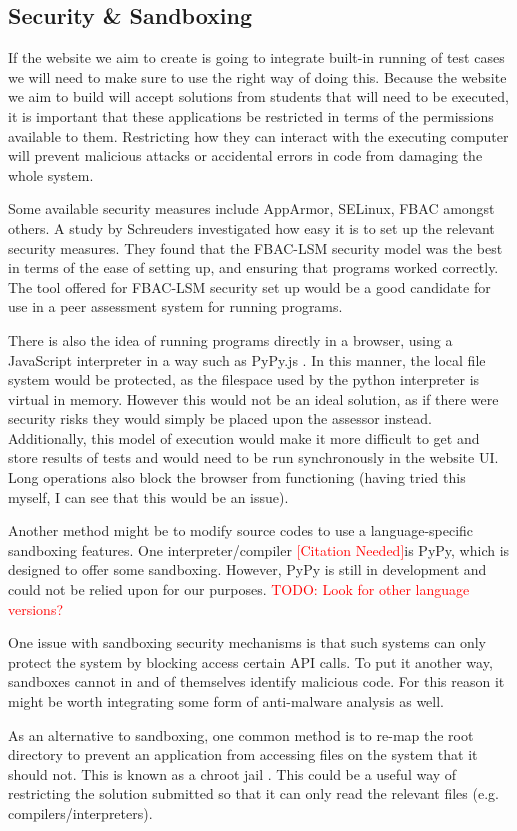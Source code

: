 \documentclass[a4paper,11pt]{report}
\newcommand{\cn}{\textcolor{red}{[Citation Needed]}}
\newcommand{\todo}[1]{\textcolor{red}{TODO: #1}}
\begin{document}
\subsection{Security \& Sandboxing}
If the website we aim to create is going to integrate built-in running of test cases we will need to make sure to use the right way of doing this. Because the website we aim to build will accept solutions from students that will need to be executed, it is important that these applications be restricted in terms of the permissions available to them. Restricting how they can interact with the executing computer will prevent malicious attacks or accidental errors in code from damaging the whole system.\par
Some available security measures include AppArmor, SELinux, FBAC amongst others. A study by Schreuders \cite{schreuders_empowering_2011} investigated how easy it is to set up the relevant security measures. They found that the FBAC-LSM security model was the best in terms of the ease of setting up, and ensuring that programs worked correctly. The tool offered for FBAC-LSM security set up would be a good candidate for use in a peer assessment system for running programs.\par
There is also the idea of running programs directly in a browser, using a JavaScript interpreter in a way such as PyPy.js \cite{pypy_web_2016}. In this manner, the local file system would be protected, as the filespace used by the python interpreter is virtual in memory. However this would not be an ideal solution, as if there were security risks they would simply be placed upon the assessor instead. Additionally, this model of execution would make it more difficult to get and store results of tests and would need to be run synchronously in the website UI. Long operations also block the browser from functioning (having tried this myself, I can see that this would be an issue).\par
Another method might be to modify source codes to use a language-specific sandboxing features. One interpreter/compiler \cn is PyPy, which is designed to offer some sandboxing. However, PyPy is still in development and could not be relied upon for our purposes. \todo{Look for other language versions?}\par
One issue with sandboxing security mechanisms is that such systems can only protect the system by blocking access certain API calls. To put it another way, sandboxes cannot in and of themselves identify malicious code. For this reason it might be worth integrating some form of anti-malware analysis as well.\par
As an alternative to sandboxing, one common method is to re-map the root directory to prevent an application from accessing files on the system that it should not. This is known as a chroot jail \cite{ubuntu_basic_2016}. This could be a useful way of restricting the solution submitted so that it can only read the relevant files (e.g. compilers/interpreters).
\end{document}
